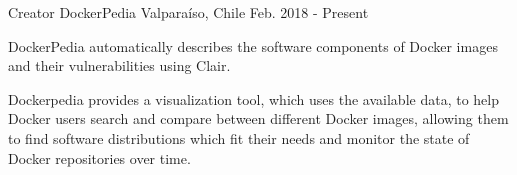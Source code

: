 \begin{cventries}
  \cventry
    {Creator}
    {DockerPedia}
    {Valparaíso, Chile}
    {Feb. 2018 - Present}
    {
      \begin{cvitems}
        \item {DockerPedia automatically describes the software components of Docker images and their vulnerabilities using Clair.}
        \item {Dockerpedia provides a visualization tool, which uses the available data, to help Docker users search and compare between different Docker images, allowing them to find software distributions which fit their needs and monitor the state of Docker repositories over time.}
      \end{cvitems}
    }

\end{cventries}
